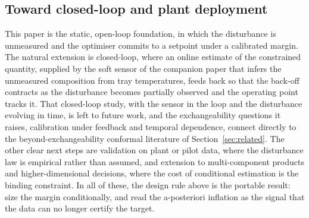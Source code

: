 \subsection{Toward closed-loop and plant deployment}

This paper is the static, open-loop foundation, in which the disturbance is unmeasured and the
optimiser commits to a setpoint under a calibrated margin. The natural extension is closed-loop,
where an online estimate of the constrained quantity, supplied by the soft sensor of the companion
paper that infers the unmeasured composition from tray temperatures, feeds back so that the
back-off contracts as the disturbance becomes partially observed and the operating point tracks
it. That closed-loop study, with the sensor in the loop and the disturbance evolving in time, is
left to future work, and the exchangeability questions it raises, calibration under feedback and
temporal dependence, connect directly to the beyond-exchangeability conformal literature of
Section~\ref{sec:related}. The other clear next steps are validation on plant or pilot data, where
the disturbance law is empirical rather than assumed, and extension to multi-component products
and higher-dimensional decisions, where the cost of conditional estimation is the binding
constraint. In all of these, the design rule above is the portable result: size the margin
conditionally, and read the a-posteriori inflation as the signal that the data can no longer
certify the target.
